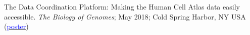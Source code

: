 \documentclass[margin,line]{res}
\begin{document}
\begin{resume}

The Data Coordination Platform: Making the Human Cell Atlas data easily accessible. {\em The Biology of Genomes}; May 2018; Cold Spring Harbor, NY USA (\href{https://drive.google.com/file/d/1KMs4VWE_1rEAFeKLHWrFxHaly5Db78By/view?usp=sharing}{\textcolor{blue}{poster}})













\end{resume}
\end{document}
